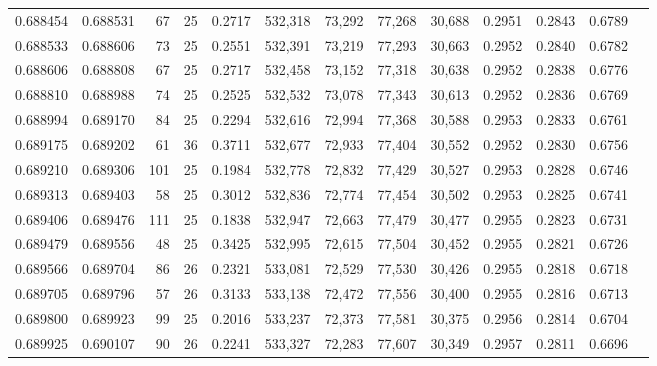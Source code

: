 \begin{tabular}{rrrrrrrrrrrrr}
0.688454 & 0.688531 &    67 &  25 &                                     0.2717 & 532,318 &  73,292 &  77,268 &  30,688 & 0.2951 & 0.2843 & 0.6789 \\
0.688533 & 0.688606 &    73 &  25 &                                     0.2551 & 532,391 &  73,219 &  77,293 &  30,663 & 0.2952 & 0.2840 & 0.6782 \\
0.688606 & 0.688808 &    67 &  25 &                                     0.2717 & 532,458 &  73,152 &  77,318 &  30,638 & 0.2952 & 0.2838 & 0.6776 \\
0.688810 & 0.688988 &    74 &  25 &                                     0.2525 & 532,532 &  73,078 &  77,343 &  30,613 & 0.2952 & 0.2836 & 0.6769 \\
0.688994 & 0.689170 &    84 &  25 &                                     0.2294 & 532,616 &  72,994 &  77,368 &  30,588 & 0.2953 & 0.2833 & 0.6761 \\
0.689175 & 0.689202 &    61 &  36 &                                     0.3711 & 532,677 &  72,933 &  77,404 &  30,552 & 0.2952 & 0.2830 & 0.6756 \\
0.689210 & 0.689306 &   101 &  25 &                                     0.1984 & 532,778 &  72,832 &  77,429 &  30,527 & 0.2953 & 0.2828 & 0.6746 \\
0.689313 & 0.689403 &    58 &  25 &                                     0.3012 & 532,836 &  72,774 &  77,454 &  30,502 & 0.2953 & 0.2825 & 0.6741 \\
0.689406 & 0.689476 &   111 &  25 &                                     0.1838 & 532,947 &  72,663 &  77,479 &  30,477 & 0.2955 & 0.2823 & 0.6731 \\
0.689479 & 0.689556 &    48 &  25 &                                     0.3425 & 532,995 &  72,615 &  77,504 &  30,452 & 0.2955 & 0.2821 & 0.6726 \\
0.689566 & 0.689704 &    86 &  26 &                                     0.2321 & 533,081 &  72,529 &  77,530 &  30,426 & 0.2955 & 0.2818 & 0.6718 \\
0.689705 & 0.689796 &    57 &  26 &                                     0.3133 & 533,138 &  72,472 &  77,556 &  30,400 & 0.2955 & 0.2816 & 0.6713 \\
0.689800 & 0.689923 &    99 &  25 &                                     0.2016 & 533,237 &  72,373 &  77,581 &  30,375 & 0.2956 & 0.2814 & 0.6704 \\
0.689925 & 0.690107 &    90 &  26 &                                     0.2241 & 533,327 &  72,283 &  77,607 &  30,349 & 0.2957 & 0.2811 & 0.6696 \\

\end{tabular}
